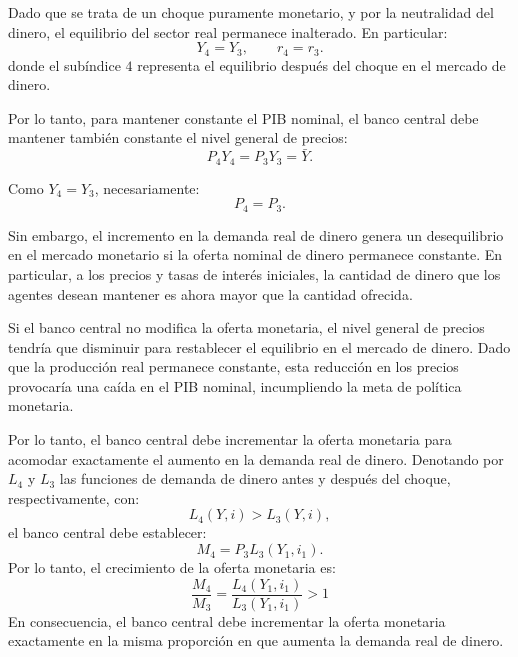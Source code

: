 \documentclass[11pt]{article}
\begin{document}
Dado que se trata de un choque puramente monetario, y por la neutralidad del dinero, el equilibrio del sector real permanece inalterado. En particular:
\[
Y_4=Y_3,
\qquad
r_4=r_3.
\]
donde el subíndice $4$ representa el equilibrio después del choque en el mercado de dinero.

Por lo tanto, para mantener constante el PIB nominal, el banco central debe mantener también constante el nivel general de precios:
\[
P_4Y_4=P_3Y_3=\bar Y.
\]

Como $Y_4=Y_3$, necesariamente:
\[
P_4=P_3.
\]

Sin embargo, el incremento en la demanda real de dinero genera un desequilibrio en el mercado monetario si la oferta nominal de dinero permanece constante. En particular, a los precios y tasas de interés iniciales, la cantidad de dinero que los agentes desean mantener es ahora mayor que la cantidad ofrecida.

Si el banco central no modifica la oferta monetaria, el nivel general de precios tendría que disminuir para restablecer el equilibrio en el mercado de dinero. Dado que la producción real permanece constante, esta reducción en los precios provocaría una caída en el PIB nominal, incumpliendo la meta de política monetaria.

Por lo tanto, el banco central debe incrementar la oferta monetaria para acomodar exactamente el aumento en la demanda real de dinero. Denotando por $L_4$ y $L_3$ las funciones de demanda de dinero antes y después del choque, respectivamente, con:
\[
L_4(Y,i)>L_3(Y,i),
\]
el banco central debe establecer:
\[
M_4=P_3L_3(Y_1,i_1).
\]
Por lo tanto, el crecimiento de la oferta monetaria es:
\[
\boxed{
\frac{M_4}{M_3}
=
\frac{L_4(Y_1,i_1)}{L_3(Y_1,i_1)}>1
}
\]
En consecuencia, el banco central debe incrementar la oferta monetaria exactamente en la misma proporción en que aumenta la demanda real de dinero.
\end{document}
